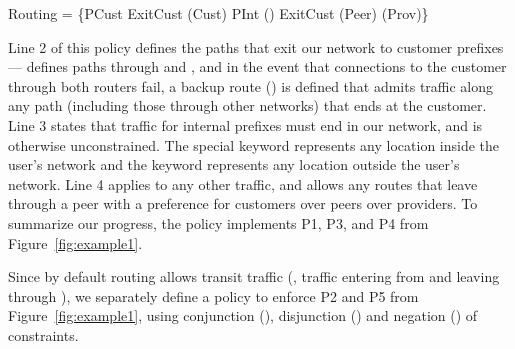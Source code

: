 
\begin{code}
\Define Routing = 
    \{PCust \Path ExitCust \Prefer \End(Cust)
     PInt  \Path \End(\In)
     \True  \Path ExitCust \Prefer \Exit(Peer) \Prefer \Exit(Prov)\}
\end{code}
\noindent
Line 2 of this policy 
defines the paths that exit our network to customer prefixes--- defines paths through  and , and in the event
that connections to the customer through both routers fail,
a backup route () is defined that admits traffic along
any path (including those through other networks) that ends at the customer.
Line 3 states that traffic for internal prefixes must end in our network, and is otherwise unconstrained.  The special keyword \In{} represents any location
inside the user's network and the keyword \Out{} represents any location
outside the user's network.
Line 4 applies to any other traffic, and allows any routes that leave through a peer with a preference for customers over peers over providers. To summarize our progress, the  policy
implements P1, P3, and P4 from Figure~\ref{fig:example1}.

Since by default routing allows transit traffic (\EG, traffic entering from
 and leaving through ), we separately define a
policy to enforce P2 and P5 from Figure~\ref{fig:example1}, using conjunction (\AND),
disjunction (\OR) and negation (\NOT) of constraints. 
%

